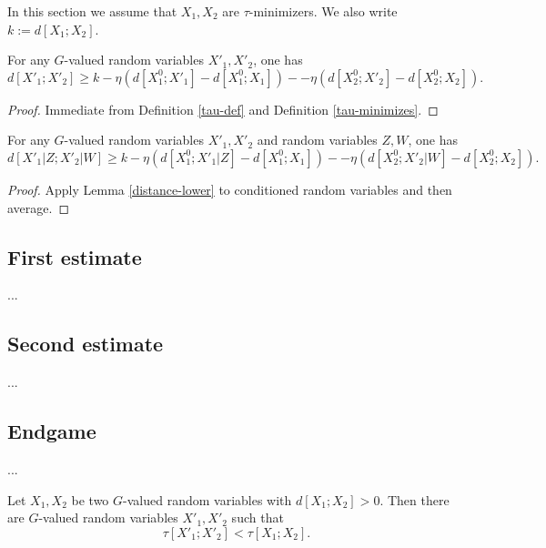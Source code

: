 In this section we assume that $X_1,X_2$ are $\tau$-minimizers. We also write $k := d[X_1;X_2]$.

\begin{lemma}\label{distance-lower}
  For any $G$-valued random variables $X'_1,X'_2$, one has
$$ d[X'_1;X'_2] \geq k - \eta (d[X^0_1;X'_1] - d[X^0_1;X_1] ) - - \eta (d[X^0_2;X'_2] - d[X^0_2;X_2] ).$$
\end{lemma}

\begin{proof}
  Immediate from Definition \ref{tau-def} and Definition \ref{tau-minimizes}.
\end{proof}

\begin{lemma}\label{cond-distance-lower}
  For any $G$-valued random variables $X'_1,X'_2$ and random variables $Z,W$, one has
$$ d[X'_1|Z;X'_2|W] \geq k - \eta (d[X^0_1;X'_1|Z] - d[X^0_1;X_1] ) - - \eta (d[X^0_2;X'_2|W] - d[X^0_2;X_2] ).$$
\end{lemma}

\begin{proof}  Apply Lemma \ref{distance-lower} to conditioned random variables and then average.
\end{proof}

\subsection{First estimate}

...

\subsection{Second estimate}

...

\subsection{Endgame}

...

\begin{theorem}\label{de-prop}
  Let $X_1, X_2$ be two $G$-valued random variables with $d[X_1;X_2] > 0$. Then there are $G$-valued random variables $X'_1, X'_2$ such that
$$\tau[X'_1;X'_2] < \tau[X_1;X_2].
$$
\end{theorem}

